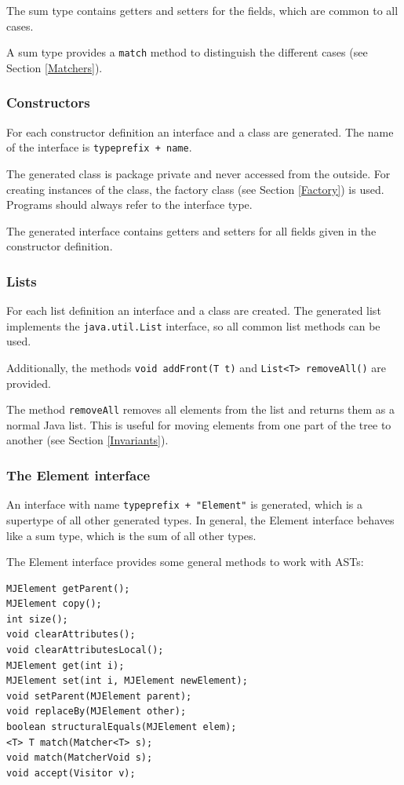 \documentclass{scrartcl}
\begin{document}
The sum type contains getters and setters for the fields, which are common to all cases.

A sum type provides a \lstinline!match! method to distinguish the different cases (see Section \ref{Matchers}).

\subsubsection{Constructors}

For each constructor definition an interface and a class are generated.
The name of the interface is \lstinline!typeprefix + name!.

The generated class is package private and never accessed from the outside.
For creating instances of the class, the factory class (see Section \ref{Factory}) is used.
Programs should always refer to the interface type.

The generated interface contains getters and setters for all fields given in the constructor definition.

\subsubsection{Lists}

For each list definition an interface and a class are created.
The generated list implements the \lstinline!java.util.List! interface, so all common list methods can be used.

Additionally, the methods \lstinline!void addFront(T t)! and \lstinline!List<T> removeAll()! are provided.

The method \lstinline!removeAll! removes all elements from the list and returns them as a normal Java list.
This is useful for moving elements from one part of the tree to another (see Section \ref{Invariants}).


\subsubsection{The Element interface}

An interface with name \lstinline!typeprefix + "Element"! is generated, which is a supertype of all other generated types.
In general, the Element interface behaves like a sum type, which is the sum of all other types.

The Element interface provides some general methods to work with ASTs:

\begin{lstlisting}
MJElement getParent();
MJElement copy();
int size();
void clearAttributes();
void clearAttributesLocal();
MJElement get(int i);
MJElement set(int i, MJElement newElement);
void setParent(MJElement parent);
void replaceBy(MJElement other);
boolean structuralEquals(MJElement elem);
<T> T match(Matcher<T> s);
void match(MatcherVoid s);
void accept(Visitor v);
\end{lstlisting}
\end{document}

